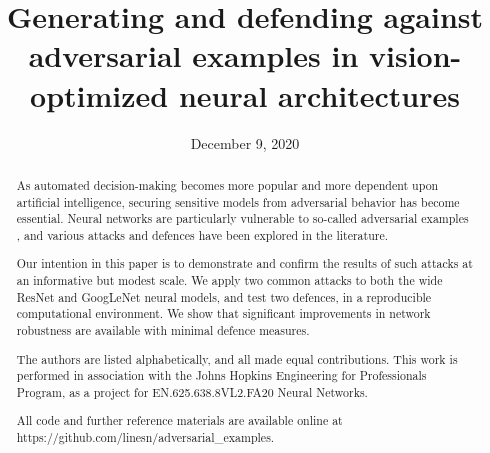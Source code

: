 \documentclass[conference]{IEEEtran}
\begin{document}
\title{Generating and defending against adversarial examples in
vision-optimized neural architectures}
\specialpapernotice{}
\date{December 9, 2020}

\author{
\and
{}
\and
{}
}%

\maketitle%

\begin{abstract}%

As automated decision-making becomes more popular and more dependent upon
artificial intelligence, securing sensitive models from adversarial behavior
has become essential. Neural networks are particularly vulnerable to
so-called adversarial examples \cite{szegedy2014intriguing}, and various
attacks and defences have been explored in the literature.

Our intention in this paper is to demonstrate and confirm the results of
such attacks at an informative but modest scale. We apply two common attacks
to both the wide ResNet and GoogLeNet neural models, and test two defences,
in a reproducible computational environment. We show that significant
improvements in network robustness are available with minimal defence
measures.

The authors are listed alphabetically, and all made equal contributions.
This work is performed in association with the Johns Hopkins Engineering for
Professionals Program, as a project for EN.625.638.8VL2.FA20 Neural Networks.

All code and further reference materials are available online at
https://github.com/linesn/adversarial\_examples.

\end{abstract}%
\end{document}
